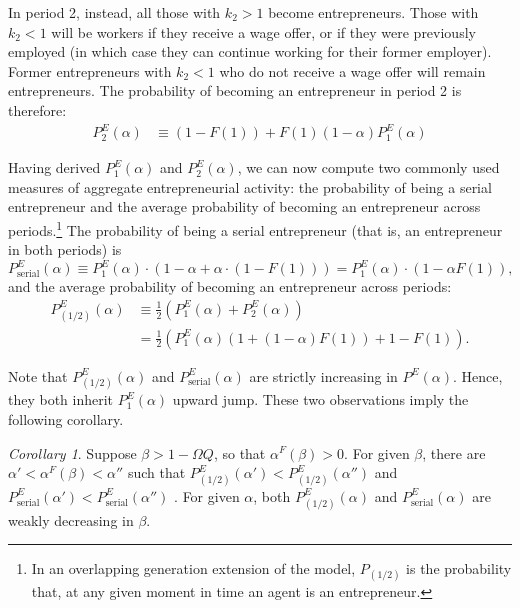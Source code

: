 \documentclass[12pt,american]{paper}
\theoremstyle{remark}
\newtheorem{cor}{Corollary}
\begin{document}
In period 2, instead, all those with $k_2>1$ become entrepreneurs. Those with  $k_2<1$ will be workers if they receive a wage offer, or if they were previously employed (in which case they can continue working for their former employer). Former entrepreneurs with $k_2<1$ who do not receive  a wage offer will remain entrepreneurs.  The probability of becoming an entrepreneur in period 2 is therefore:
\begin{align*}
P_2^E(\alpha)&\equiv (1-F(1)) + F(1) (1-\alpha)P_1^E(\alpha) %
\end{align*}

Having derived $P_1^E(\alpha)$ and $P_2^E(\alpha)$, we can now compute two commonly used measures of aggregate entrepreneurial activity: the probability of being a serial entrepreneur and the average probability of becoming an entrepreneur across periods.\footnote{In an overlapping generation extension of the model, $P_{(1/2)}$ is the probability that, at any given moment in time an agent is an entrepreneur.}
The probability of being a serial entrepreneur (that is, an entrepreneur in both periods) is
$$
P_{\mbox{serial}}^E(\alpha)\equiv P_1^E(\alpha) \cdot (1-\alpha +  \alpha \cdot (1-F(1)))= P_1^E (\alpha)  \cdot \left(1-\alpha F(1) \right),
$$
and the average probability of becoming an entrepreneur across periods:
\begin{align*}
P_{(1/2)}^E(\alpha)&\equiv \frac{1}{2} \left( P_1^E(\alpha) + P_2^E(\alpha) \right)\\
&= \frac{1}{2} \left( P_1^E(\alpha) \left(1+(1-\alpha)F(1)\right) + 1 -F(1)  \right). 
\end{align*} 

Note that $P_{(1/2)}^E(\alpha)$ and $P_{\mbox{serial}}^E(\alpha)$ are strictly increasing in $P^E(\alpha)$. Hence,  they both inherit $ P_1^E(\alpha)$ upward jump. These two observations imply the following corollary.


\begin{cor}\label{prop:probability-of-entrepreneurship}
Suppose $\beta>1-\Omega Q$, so that $\alpha^F(\beta) > 0$. For given $\beta$, there are $\alpha'<\alpha^F(\beta)<\alpha''$ such that $P^E_{(1/2)}(\alpha')<P^E_{(1/2)}(\alpha'')$ and $P^E_{\mbox{serial}}(\alpha')<P^E_{\mbox{serial}}(\alpha'')$ . For given $\alpha$, both $P_{(1/2)}^E(\alpha)$ and $P_{\mbox{serial}}^E(\alpha)$ are weakly decreasing in $\beta$.
\end{cor}
\end{document}
